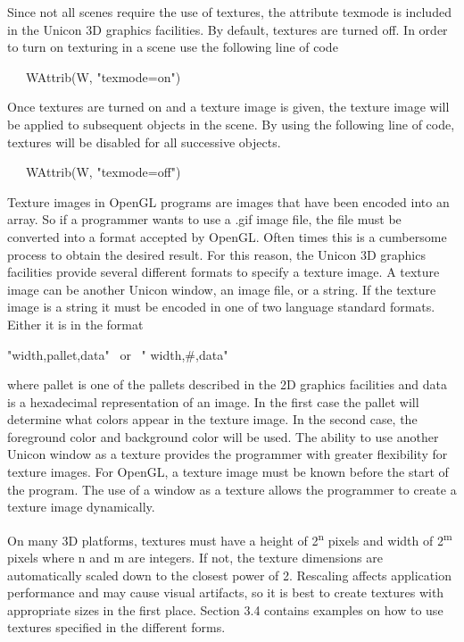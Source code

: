 \documentclass[letterpaper]{article}
\begin{document}
Since not all scenes require the use of textures, the attribute
\textsf{texmode} is included in the Unicon 3D graphics facilities. By
default, textures are turned off. In order to turn on texturing in a
scene use the following line of code

{\ttfamily
\ \ \ \textsf{WAttrib(W, "texmode=on")} }

Once textures are turned on and a texture image is given, the texture
image will be applied to subsequent objects in the scene. By using the
following line of code, textures will be disabled for all successive
objects.

{\ttfamily
\ \ \ \textsf{WAttrib(W, "texmode=off")}}

Texture images in OpenGL programs are images that have been encoded
into an array. So if a programmer wants to use a .gif image file, the
file must be converted into a format accepted by OpenGL. Often times
this is a cumbersome process to obtain the desired result. For this
reason, the Unicon 3D graphics facilities provide several different
formats to specify a texture image. A texture image can be another
Unicon window, an image file, or a string. If the texture image is a
string it must be encoded in one of two language standard
formats. Either it is in the format

{\sffamily
"width,pallet,data" \ \textrm{or} \ " width,\#,data"}

\noindent where \textsf{pallet} is one of the pallets described in the 2D
graphics facilities and data is a hexadecimal representation of an
image. In the first case the pallet will determine what colors appear
in the texture image. In the second case, the foreground color and
background color will be used. The ability to use another Unicon
window as a texture provides the programmer with greater flexibility
for texture images. For OpenGL, a texture image must be known before
the start of the program. The use of a window as a texture allows
the programmer to create a texture image dynamically.

On many 3D platforms,
textures must have a height of 2\textsuperscript{n} pixels and width
of 2\textsuperscript{m} pixels where n and m are integers. If not, the
texture dimensions are automatically scaled down to the closest power
of 2. Rescaling affects application performance and may cause visual
artifacts, so it is best to create textures with appropriate sizes
in the first place. Section 3.4 contains examples on how to use
textures specified in the different forms.
\end{document}
